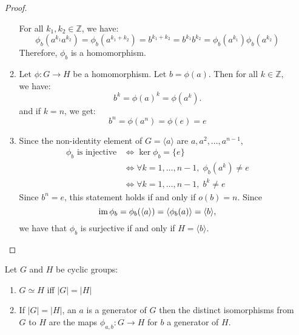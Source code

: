 \begin{itemize}
\begin{proof}
\begin{enumerate}
            For all $k_1,k_2 \in \mathbb{Z}$, we have:
            \begin{equation}
                \phi_b(a^{k_1}a^{k_2})=\phi_b(a^{k_1+k_2})=b^{k_1+k_2}=b^{k_1}b^{k_2}=\phi_b(a^{k_1})\phi_b(a^{k_2})
            \end{equation}
            Therefore, $\phi_b$ is a homomorphism.
            \item Let $\phi:G\rightarrow H$ be a homomorphism. Let $b=\phi(a)$. Then for all $k\in \mathbb{Z}$, we have:
            \begin{equation}
                b^k = \phi(a)^k = \phi(a^k).
            \end{equation}
            and if $k=n$, we get:
            \begin{equation}
                b^n = \phi(a^n) = \phi(e) = e
            \end{equation}
            \item Since the non-identity element of $G=\langle a\rangle$ are $a,a^2,\dots,a^{n-1}$,
            \begin{align}
                \phi_b\text{ is injective} &\iff \ker\phi_b = \{e\} \\ 
                &\iff \forall k=1,\dots,n-1,\;\phi_b(a^k)\neq e\\ 
                &\iff \forall k=1,\dots,n-1,\; b^k \neq e
            \end{align}
            Since $b^n=e$, this statement holds if and only if $o(b)=n$. Since
            \begin{equation}
                \operatorname{im}\phi_b = \phi_b(\langle a\rangle) = \langle \phi_b(a) \rangle = \langle b\rangle,
            \end{equation}
            we have that $\phi_b$ is surjective if and only if $H=\langle b\rangle$. 
        \end{enumerate}
    \end{proof}
    \begin{corollary}
        Let $G$ and $H$ be cyclic groups:
        \begin{enumerate}
            \item $G \simeq H$ iff $|G|=|H|$
            \item If $|G| = |H|$, an $a$ is a generator of $G$ then the distinct isomorphisms from $G$ to $H$ are the maps $\phi_{a,b}:G\rightarrow H$ for $b$ a generator of $H$.
            

\end{enumerate}
\end{corollary}
\end{itemize}
